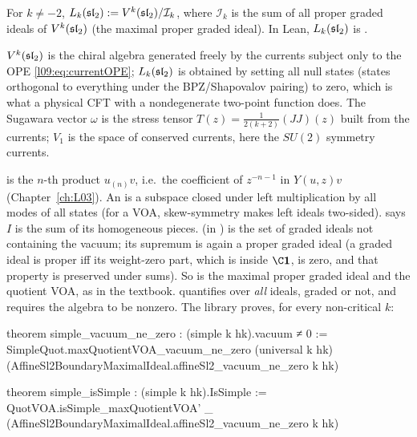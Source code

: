 \begin{definition}\label{l09:def:Lk}
For $k\neq-2$, $L_k(\mathfrak{sl}_2) := V^k(\mathfrak{sl}_2)/\mathcal{I}_k$, where $\mathcal{I}_k$ is the sum of all
proper graded ideals of $V^k(\mathfrak{sl}_2)$ (the maximal proper graded ideal). In Lean,
$L_k(\mathfrak{sl}_2)$ is .
\end{definition}
\begin{physics}
$V^k(\mathfrak{sl}_2)$ is the chiral algebra generated freely by the currents subject only to the OPE
\eqref{l09:eq:currentOPE}; $L_k(\mathfrak{sl}_2)$ is obtained by setting all null states (states orthogonal to
everything under the BPZ/Shapovalov pairing) to zero, which is what a physical CFT with a nondegenerate
two-point function does. The Sugawara vector $\omega$ is the stress tensor $T(z) = \frac{1}{2(k+2)}(J J)(z)$
built from the currents; $V_1$ is the space of conserved currents, here the $SU(2)$ symmetry currents.
\end{physics}


\begin{dictionary}
 is the $n$-th product $u_{(n)}v$, i.e.\ the coefficient of $z^{-n-1}$ in
$Y(u,z)v$ (Chapter~\ref{ch:L03}). An  is a subspace closed under left multiplication by
all modes of all states (for a VOA, skew-symmetry makes left ideals two-sided). 
says $I$ is the sum of its homogeneous pieces.  (in
) is the set of graded ideals not containing the vacuum; its
supremum  is again a proper graded ideal (a graded ideal is proper iff its weight-zero
part, which is inside $\C\lnineone$, is zero, and that property is preserved under sums). So
 is the maximal proper graded ideal and  the quotient VOA,
as in the textbook.  quantifies over \emph{all} ideals, graded or not, and requires
the algebra to be nonzero. The library proves, for every non-critical $k$:
\end{dictionary}

\begin{leancode}
theorem simple_vacuum_ne_zero : (simple k hk).vacuum ≠ 0 :=
  SimpleQuot.maxQuotientVOA_vacuum_ne_zero (universal k hk)
    (AffineSl2BoundaryMaximalIdeal.affineSl2_vacuum_ne_zero k hk)
\end{leancode}
\begin{leancode}
theorem simple_isSimple : (simple k hk).IsSimple :=
  QuotVOA.isSimple_maxQuotientVOA' _
    (AffineSl2BoundaryMaximalIdeal.affineSl2_vacuum_ne_zero k hk)
\end{leancode}

